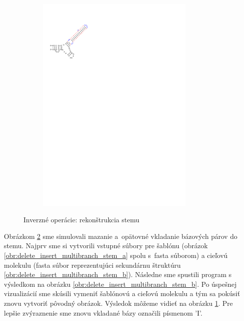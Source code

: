 \begin{figure}[H]
\begin{subfigure}{0.3\textwidth}
    \includegraphics[clip, trim=1cm 21cm 14cm 2.5cm, width=0.85\textwidth]{../img/alg/insert/2/multibranch-del-ins}
    \caption{}
    \label{obr:delete_insert_multibranch_stem_c}
  \end{subfigure}
  \caption{Inverzné operácie: rekonštrukcia stemu}
  \label{obr:delete_insert_multibranch_stem}
\end{figure}

Obrázkom \ref{obr:delete_insert_multibranch_stem} sme simulovali mazanie a~opätovné vkladanie
bázových párov do stemu.
Najprv sme si vytvorili vstupné súbory pre šablónu (obrázok
\ref{obr:delete_insert_multibranch_stem_a} spolu s~fasta súborom)
a cieľovú molekulu (fasta súbor reprezentujúci sekundárnu štruktúru
\ref{obr:delete_insert_multibranch_stem_b}). Následne sme spustili program
s výsledkom na obrázku \ref{obr:delete_insert_multibranch_stem_b}.
Po úspešnej vizualizácií sme skúsili vymeniť šablónovú a cieľovú molekulu
a tým sa pokúsiť znovu vytvoriť pôvodný obrázok. Výsledok môžeme vidieť
na obrázku \ref{obr:delete_insert_multibranch_stem_c}.
Pre lepšie zvýraznenie sme znovu vkladané bázy označili písmenom 'I'.

